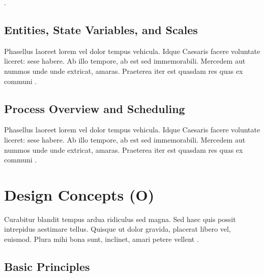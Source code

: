 
.  

\section{Entities, State Variables, and Scales}

Phasellus laoreet lorem vel dolor tempus vehicula. Idque Caesaris facere voluntate liceret: sese habere. Ab illo tempore, ab est sed immemorabili. Mercedem aut nummos unde unde extricat, amaras. Praeterea iter est quasdam res quas ex communi \autocite{grimm2006a}.

\section{Process Overview and Scheduling}

Phasellus laoreet lorem vel dolor tempus vehicula. Idque Caesaris facere voluntate liceret: sese habere. Ab illo tempore, ab est sed immemorabili. Mercedem aut nummos unde unde extricat, amaras. Praeterea iter est quasdam res quas ex communi \autocite{grimm2010}.

\chapter{Design Concepts (O)}

Curabitur blandit tempus ardua ridiculus sed magna. Sed haec quis possit intrepidus aestimare tellus. Quisque ut dolor gravida, placerat libero vel, euismod. Plura mihi bona sunt, inclinet, amari petere vellent \autocite{grimm2006b}.

\section{Basic Principles}

